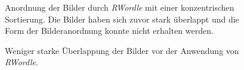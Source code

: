 \documentclass[12pt, ngerman, utf8]{article}
\begin{document}
\begin{figure}[hp]
    \noindent
    \caption{Anordnung der Bilder durch \textit{RWordle} mit einer konzentrischen Sortierung. Die Bilder haben sich zuvor stark überlappt und die Form der Bilderanordnung konnte nicht erhalten werden.}
    \label{fig:rwordle-flower-con1}
\end{figure}
\begin{figure}[hp]
    \noindent
    \caption{Weniger starke Überlappung der Bilder vor der Anwendung von \textit{RWordle}.}
    \label{fig:rwordle-flower-overlap-less}
\end{figure}
\end{document}
